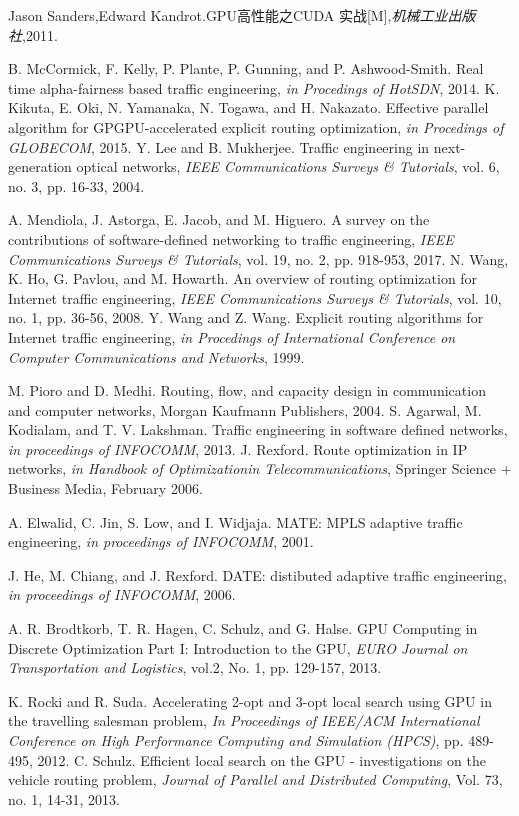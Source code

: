\documentclass[master]{thesis-uestc}
\begin{document}
\begin{thebibliography}{1}
Jason Sanders,Edward Kandrot.GPU高性能之CUDA 实战[M],\emph{机械工业出版社},2011.

B. McCormick, F. Kelly, P. Plante, P. Gunning, and P. Ashwood-Smith. Real time alpha-fairness based traffic engineering, \emph{in Procedings of HotSDN}, 2014.
K. Kikuta, E. Oki, N. Yamanaka, N. Togawa, and H. Nakazato. Effective parallel algorithm for GPGPU-accelerated explicit routing optimization, \emph{in Procedings of GLOBECOM}, 2015.
Y. Lee and B. Mukherjee. Traffic engineering in next-generation optical networks, \emph{IEEE Communications Surveys \& Tutorials}, vol. 6, no. 3, pp. 16-33, 2004.

A. Mendiola, J. Astorga, E. Jacob, and M. Higuero. A survey on the contributions of software-defined networking to traffic engineering, \emph{IEEE Communications Surveys \& Tutorials}, vol. 19, no. 2, pp. 918-953, 2017.
N. Wang, K. Ho, G. Pavlou, and M. Howarth. An overview of routing optimization for Internet traffic engineering, \emph{IEEE Communications Surveys \& Tutorials}, vol. 10, no. 1, pp. 36-56, 2008.
Y. Wang and Z. Wang. Explicit routing algorithms for Internet traffic engineering, \emph{in Procedings of International Conference on Computer Communications and Networks}, 1999.

M. Pioro and D. Medhi. Routing, flow, and capacity design in communication and computer networks, Morgan Kaufmann Publishers, 2004.
S. Agarwal, M. Kodialam, and T. V. Lakshman. Traffic engineering in software defined networks, \emph{in proceedings of INFOCOMM}, 2013.
J. Rexford. Route optimization in IP networks, \emph{in Handbook of Optimizationin Telecommunications}, Springer Science + Business Media, February 2006.

A. Elwalid, C. Jin, S. Low, and I. Widjaja. MATE: MPLS adaptive traffic engineering, \emph{in proceedings of INFOCOMM}, 2001.

J. He, M. Chiang, and J. Rexford. DATE: distibuted adaptive traffic engineering, \emph{in proceedings of INFOCOMM}, 2006.

A. R. Brodtkorb, T. R. Hagen, C. Schulz, and G. Halse. GPU Computing in Discrete Optimization Part I: Introduction to the GPU, \emph{EURO Journal on Transportation and Logistics}, vol.2, No. 1, pp. 129-157, 2013.

K. Rocki and R. Suda. Accelerating 2-opt and 3-opt local search using GPU in the travelling salesman problem, \emph{In Proceedings of IEEE/ACM International Conference on High Performance Computing
and Simulation (HPCS)}, pp. 489-495, 2012.
C. Schulz. Efficient local search on the GPU - investigations on the vehicle routing problem, \emph{Journal of Parallel and Distributed Computing}, Vol. 73, no. 1, 14-31, 2013.


\end{thebibliography}
\end{document}
